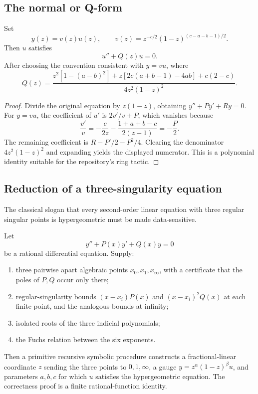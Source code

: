 \subsection{The normal or Q-form}

\begin{proposition}\label{prop:q-form}
Set
\[
 y(z)=v(z)u(z),
 \qquad
 v(z)=z^{-c/2}(1-z)^{(c-a-b-1)/2}.
\]
Then \(u\) satisfies
\[
 u''+Q(z)u=0.
\]
After choosing the convention consistent with \(y=vu\), where
\[
 Q(z)=
 \frac{z^2[1-(a-b)^2]
       +z[2c(a+b-1)-4ab]+c(2-c)}
      {4z^2(1-z)^2}.
\]
\end{proposition}

\begin{proof}
Divide the original equation by \(z(1-z)\), obtaining
\(y''+Py'+Ry=0\).  For \(y=vu\), the coefficient of \(u'\) is
\(2v'/v+P\), which vanishes because
\[
 \frac{v'}v=-\frac{c}{2z}-\frac{1+a+b-c}{2(z-1)}=-\frac P2.
\]
The remaining coefficient is \(R-P'/2-P^2/4\).  Clearing the denominator
\(4z^2(1-z)^2\) and expanding yields the displayed numerator.  This is a
polynomial identity suitable for the repository's ring tactic.
\end{proof}

\subsection{Reduction of a three-singularity equation}

The classical slogan that every second-order linear equation with three
regular singular points is hypergeometric must be made data-sensitive.

\begin{theorem}\label{thm:riemann-reduction}
Let
\[
 y''+P(x)y'+Q(x)y=0
\]
be a rational differential equation.  Supply:
\begin{enumerate}
\item three pairwise apart algebraic points \(x_0,x_1,x_\infty\), with a
certificate that the poles of \(P,Q\) occur only there;
\item regular-singularity bounds
\((x-x_i)P(x)\) and \((x-x_i)^2Q(x)\) at each finite point, and the analogous
bounds at infinity;
\item isolated roots of the three indicial polynomials;
\item the Fuchs relation between the six exponents.
\end{enumerate}
Then a primitive recursive symbolic procedure constructs a fractional-linear
coordinate \(z\) sending the three points to \(0,1,\infty\), a gauge
\(y=z^\alpha(1-z)^\beta u\), and parameters \(a,b,c\) for which \(u\)
satisfies the hypergeometric equation.  The correctness proof is a finite
rational-function identity.
\end{theorem}

